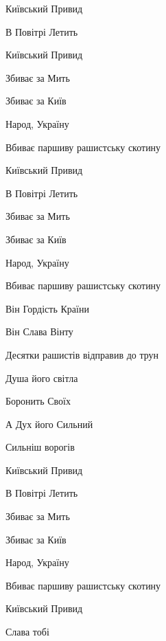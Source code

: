  
 
 






Київський Привид

В Повітрі Летить

Київський Привид

Збиває за Мить

Збиває за Київ

Народ, Україну

Вбиває паршиву рашистську скотину

Київський Привид

В Повітрі Летить

Збиває за Мить

Збиває за Київ

Народ, Україну

Вбиває паршиву рашистську скотину

Він Гордість Країни

Він Слава Вінту

Десятки рашистів відправив до трун

Душа його світла

Боронить Своїх

А Дух його Сильний

Сильніш ворогів

Київський Привид

В Повітрі Летить

Збиває за Мить

Збиває за Київ

Народ, Україну

Вбиває паршиву рашистську скотину

Київський Привид

Слава тобі

